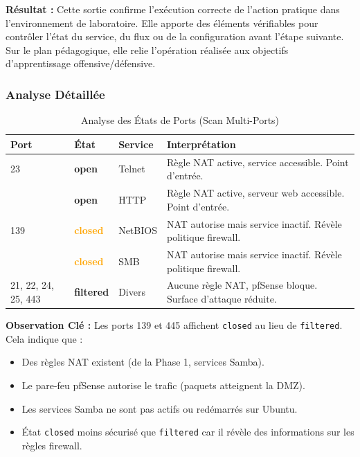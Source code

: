 \documentclass[12pt,a4paper,openany]{report}
\newcommand{\tableheadcolor}{\rowcolor{tableheadbg}}
\begin{document}
	\textbf{Résultat :} Cette sortie confirme l'exécution correcte de l'action pratique dans l'environnement de laboratoire. Elle apporte des éléments vérifiables pour contrôler l'état du service, du flux ou de la configuration avant l'étape suivante. Sur le plan pédagogique, elle relie l'opération réalisée aux objectifs d'apprentissage offensive/défensive.
	
	
	\subsubsection{Analyse Détaillée}
	\begin{table}[H]
		\centering
		\small
		\renewcommand{\arraystretch}{1.5}
		\setlength{\arrayrulewidth}{0.5pt}
		\begin{tabular}{>{\centering\arraybackslash}p{1.8cm} >{\centering\arraybackslash}p{2.5cm} p{3cm} p{6.5cm}}
			\arrayrulecolor{tableborder}
			\hline
			\tableheadcolor
			\textcolor{tableheadfg}{\textbf{Port}} &
			\textcolor{tableheadfg}{\textbf{État}} &
			\textcolor{tableheadfg}{\textbf{Service}} &
			\textcolor{tableheadfg}{\textbf{Interprétation}} \\
			\hline
			\rowcolor{tablerowalt}
			23 & \textcolor{green!50!black}{\textbf{open}} & Telnet & Règle NAT active, service accessible. Point d'entrée. \\
			
			80 & \textcolor{green!50!black}{\textbf{open}} & HTTP & Règle NAT active, serveur web accessible. Point d'entrée. \\
			
			\rowcolor{tablerowalt}
			139 & \textcolor{orange}{\textbf{closed}} & NetBIOS & NAT autorise mais service inactif. Révèle politique firewall. \\
			
			445 & \textcolor{orange}{\textbf{closed}} & SMB & NAT autorise mais service inactif. Révèle politique firewall. \\
			
			\rowcolor{tablerowalt}
			21, 22, 24, 25, 443 & \textcolor{accent}{\textbf{filtered}} & Divers & Aucune règle NAT, pfSense bloque. Surface d'attaque réduite. \\
			\hline
		\end{tabular}
		\caption{Analyse des États de Ports (Scan Multi-Ports)}
		\label{tab:multi-port-scan-analysis}
	\end{table}
	
	\textbf{Observation Clé :} Les ports 139 et 445 affichent \texttt{closed} au lieu de \texttt{filtered}. Cela indique que :
	\begin{itemize}
		\item Des règles NAT existent (de la Phase 1, services Samba).
		\item Le pare-feu pfSense autorise le trafic (paquets atteignent la DMZ).
		\item Les services Samba ne sont pas actifs ou redémarrés sur Ubuntu.
		\item État \texttt{closed} moins sécurisé que \texttt{filtered} car il révèle des informations sur les règles firewall.
	\end{itemize}
	
\end{document}
